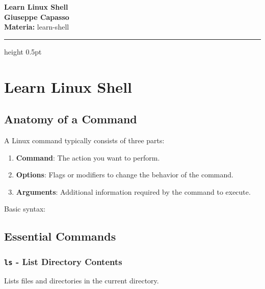 \documentclass[11pt,a4paper]{article}
\providecommand{\tightlist}{%
  \setlength{\itemsep}{0pt}\setlength{\parskip}{0pt}}
\newcommand{\proposaltitle}[1]{
    \begin{center}
        \vspace*{0.1cm}
        {\LARGE \bfseries \color{blue} #1} \\[1.5ex]
        {\large \textbf{Giuseppe Capasso}} \\[1ex]
                \small{
            \vspace{0.1cm}
            \textbf{Materia:} learn-shell\\
        }
            \end{center}
    \vspace{0.3cm}
    \hrule height 0.5pt
    \vspace{0.5cm}
}
\begin{document}
\proposaltitle{Learn Linux Shell}

\section{Learn Linux Shell}\label{learn-linux-shell}

\subsection{Anatomy of a Command}\label{anatomy-of-a-command}

A Linux command typically consists of three parts:

\begin{enumerate}
\def\labelenumi{\arabic{enumi}.}
\tightlist
\item
  \textbf{Command}: The action you want to perform.
\item
  \textbf{Options}: Flags or modifiers to change the behavior of the
  command.
\item
  \textbf{Arguments}: Additional information required by the command to
  execute.
\end{enumerate}

Basic syntax:

\begin{Shaded}
\begin{Highlighting}[]
 \PreprocessorTok{[}\PreprocessorTok{]} \PreprocessorTok{[}\PreprocessorTok{]}
\end{Highlighting}
\end{Shaded}

\subsection{Essential Commands}\label{essential-commands}

\subsubsection{\texorpdfstring{\texttt{ls} - List Directory
Contents}{ls - List Directory Contents}}\label{ls---list-directory-contents}

Lists files and directories in the current directory.

\begin{Shaded}
\begin{Highlighting}[]
 \PreprocessorTok{[}\PreprocessorTok{]} \PreprocessorTok{[}\PreprocessorTok{]}
\end{Highlighting}
\end{Shaded}
\end{document}
